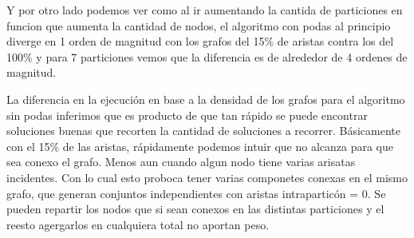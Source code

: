 Y por otro lado podemos ver como al ir aumentando la cantida de particiones en funcion que aumenta la cantidad de nodos, el algoritmo con podas al principio diverge en 1 orden de magnitud con los grafos del 15\% de aristas contra los del 100\% y para 7 particiones vemos que la diferencia es de alrededor de 4 ordenes de magnitud.

La diferencia en la ejecuci\'on en base a la densidad de los grafos para el algoritmo sin podas inferimos que es producto de que tan r\'apido se puede encontrar soluciones buenas que recorten la cantidad de soluciones a recorrer. B\'asicamente con el 15\% de las aristas, r\'apidamente podemos intuir que no alcanza para que sea conexo el grafo. Menos aun cuando algun nodo tiene varias arisatas incidentes. Con lo cual esto proboca tener varias componetes conexas en el mismo grafo, que generan conjuntos independientes con aristas intrapartic\'on = 0. Se pueden  repartir los nodos que si sean conexos en las distintas particiones y el reesto agergarlos en cualquiera total no aportan peso.

